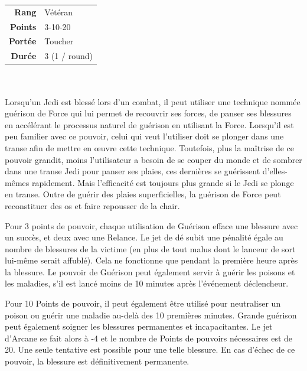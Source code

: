 \begin{description}[align=left]
        \begin{tabular}{ r l }
            \textbf{Rang}    & Vétéran \\
            \textbf{Points}  & 3-10-20 \\
            \textbf{Portée}  & Toucher \\
            \textbf{Durée}   & 3 (1 / round) \\
        \end{tabular}
        \\ \\
        Lorsqu’un Jedi est blessé lors d’un combat, il peut utiliser une technique nommée guérison de Force qui lui permet de recouvrir ses forces, de panser ses blessures en accélérant le processus naturel de guérison en utilisant la Force. Lorsqu’il est peu familier avec ce pouvoir, celui qui veut l’utiliser doit se plonger dans une transe afin de mettre en \oe{uvre} cette technique. Toutefois, plus la maîtrise de ce pouvoir grandit, moins l’utilisateur a besoin de se couper du monde et de sombrer dans une transe Jedi pour panser ses plaies, ces dernières se guérissent d’elles-mêmes rapidement. Mais l’efficacité est toujours plus grande si le Jedi se plonge en transe. Outre de guérir des plaies superficielles, la guérison de Force peut reconstituer des os et faire repousser de la chair. 

        Pour 3 points de pouvoir, chaque utilisation de Guérison efface une blessure avec un succès, et deux avec une Relance. Le jet de dé subit une pénalité égale au nombre de blessures de la victime (en plus de tout malus dont le lanceur de sort lui-même serait affublé). Cela ne fonctionne que pendant la première heure après la blessure. Le pouvoir de Guérison peut également servir à guérir les poisons et les maladies, s’il est lancé moins de 10 minutes après l’événement déclencheur.

        Pour 10 Points de pouvoir, il peut également être utilisé pour neutraliser un poison ou guérir une maladie au-delà des 10 premières minutes. Grande guérison peut également soigner les blessures permanentes et incapacitantes. Le jet d’Arcane se fait alors à -4 et le nombre de Points de pouvoirs nécessaires est de 20. Une seule tentative est possible pour une telle blessure. En cas d’échec de ce pouvoir, la blessure est définitivement permanente.
        \\

    \item [Lumière de la Force] ~ \\


\end{description}
